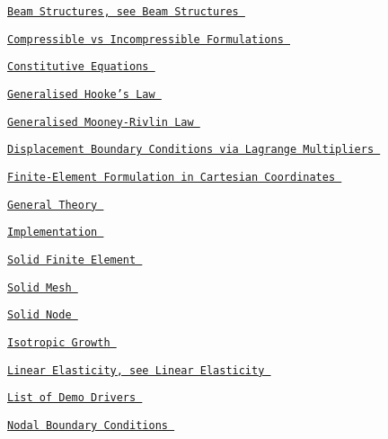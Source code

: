  
\begin{DoxyItemize}
\item  \href{ ../../index/html/index.html#B.BeamStructures }{\tt Beam Structures, see Beam Structures }  
\item  \href{ ../../solid/compressed_square/html/index.html }{\tt Compressible vs Incompressible Formulations }  
\item  \href{ ../../solid/solid_theory/html/index.html#elastic_constitutive }{\tt Constitutive Equations }  
\begin{DoxyItemize}
\item  \href{ ../../solid/disk_compression/html/index.html#hooke }{\tt Generalised Hooke's Law }  
\item  \href{ ../../solid/disk_compression/html/index.html#mr }{\tt Generalised Mooney-\/\-Rivlin Law }  
\end{DoxyItemize}
\item  \href{ ../../solid/prescribed_displ_lagr_mult/html/index.html }{\tt Displacement Boundary Conditions via Lagrange Multipliers }  
\item  \href{ ../../solid/solid_theory/html/index.html#CartesianLagrangian }{\tt Finite-\/\-Element Formulation in Cartesian Coordinates }  
\item  \href{ ../../solid/solid_theory/html/index.html }{\tt General Theory }  
\item  \href{ ../../solid/solid_theory/html/index.html#implemenation }{\tt Implementation }  
\begin{DoxyItemize}
\item  \href{ ../../solid/solid_theory/html/index.html#solid_fe }{\tt Solid Finite Element }  
\item  \href{ ../../solid/solid_theory/html/index.html#solid_mesh }{\tt Solid Mesh }  
\item  \href{ ../../solid/solid_theory/html/index.html#solid_node }{\tt Solid Node }  
\end{DoxyItemize}
\item  \href{ ../../solid/solid_theory/html/index.html#isotropic_growth }{\tt Isotropic Growth }  
\item  \href{ ../../index/html/index.html#L.LinearElasticity }{\tt Linear Elasticity, see Linear Elasticity }  
\item  \href{ ../../example_code_list/html/index.html#solid }{\tt List of Demo Drivers }  
\item  \href{ ../../beam/tensioned_string/html/index.html#solid_bound }{\tt Nodal Boundary Conditions }  

\end{DoxyItemize}
